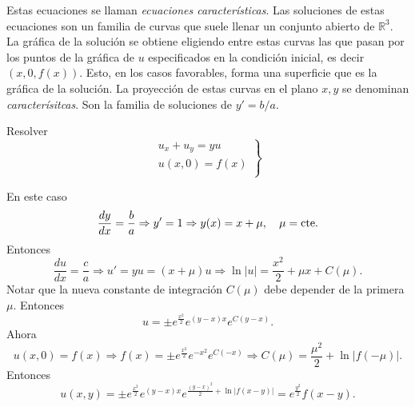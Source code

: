 Estas ecuaciones se llaman \emph{ecuaciones características}. Las soluciones de estas ecuaciones son un familia de curvas que suele llenar un conjunto abierto de  $\mathbb{R}^3$.  La gráfica de la solución se obtiene eligiendo entre estas curvas las que pasan por los puntos de la gráfica de $u$ especificados en la condición inicial, es decir $(x,0,f(x))$. Esto, en los casos favorables, forma una superficie que es la gráfica de la solución. La proyección de estas curvas en el plano $x,y$ se denominan \emph{caracterísitcas}. Son la familia de soluciones de $y'=b/a$.


\begin{ejemplo}{} Resolver
\begin{equation}\label{eq:EDP_gral_1orden}
  \left.\begin{array}{l}
  u_x+u_y=yu\\
  u(x,0)=f(x)\\
\end{array}\right\}
\end{equation}
\end{ejemplo}
En este caso
\[\frac{dy}{dx}=\frac{b}{a}\Rightarrow y'=1\Rightarrow y(x)=x+\mu,\quad\mu=\hbox{cte}.\]
Entonces
\[\frac{du}{dx}=\frac{c}{a}\Rightarrow u'=yu=(x+\mu)u\Rightarrow \ln|u|=\frac{x^2}{2}+\mu x+C(\mu).\]
Notar que la nueva constante de integración $C(\mu)$ debe depender de la primera $\mu$. Entonces
\[u=\pm e^{\frac{x^2}{2}}e^{(y-x)x}e^{C(y-x)}.\]
Ahora
\[u(x,0)=f(x)\Rightarrow f(x)=\pm e^{\frac{x^2}{2}}e^{-x^2}e^{C(-x)}\Rightarrow C(\mu)=\frac{\mu^2}{2}+\ln|f(-\mu)|.\]
Entonces
\[u(x,y)=\pm e^{\frac{x^2}{2}}e^{(y-x)x}e^{\frac{(y-x)^2}{2}+\ln|f(x-y)|        }
=e^{\frac{y^2}{2}}f(x-y).\]


